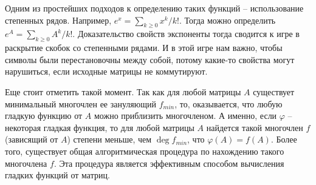 Одним из простейших подходов к определению таких функций -- использование степенных рядов.
Например, $e^x = \sum_{k\geqslant 0} x^k/k!$.
Тогда можно определить $e^A = \sum_{k\geqslant 0} A^k/k!$.
Доказательство свойств экспоненты тогда сводится к игре в раскрытие скобок со степенными рядами.
И в этой игре нам важно, чтобы символы были перестановочны между собой, потому какие-то свойства могут нарушиться, если исходные матрицы не коммутируют.

Еще стоит отметить такой момент.
Так как для любой матрицы $A$ существует минимальный многочлен ее зануляющий $f_{min}$, то, оказывается, что любую гладкую функцию от $A$ можно приблизить многочленом.
А именно, если $\varphi$ -- некоторая гладкая функция, то для любой матрицы $A$ найдется такой многочлен $f$ (зависящий от $A$) степени меньше, чем $\deg f_{min}$, что $\varphi(A) = f(A)$.
Более того, существует общая алгоритмическая процедура по нахождению такого многочлена $f$.
Эта процедура является эффективным способом вычисления гладких функций от матриц.
